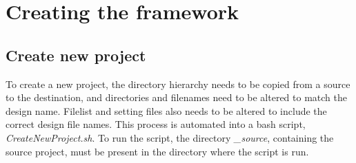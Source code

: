 \chapter{\label{chp:createframework}Creating the framework}
\section{Create new project}
To create a new project, the directory hierarchy needs to be copied from a source to the destination, and directories and filenames need to be altered to match the design name. Filelist and setting files also needs to be altered to include the correct design file names. This process is automated into a bash script, \textit{CreateNewProject.sh}. To run the script, the directory \textit{\_source}, containing the source project, must be present in the directory where the script is run.

